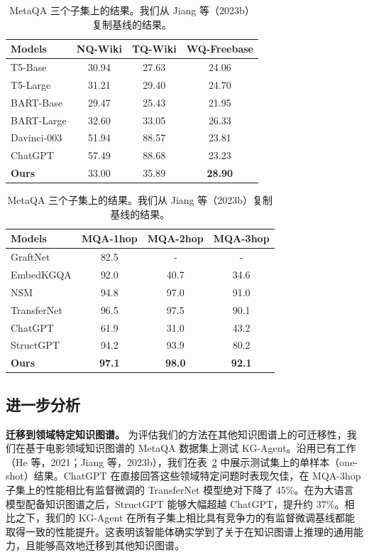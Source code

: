 \documentclass[11pt,UTF8,fontset=fandol]{ctexart}
\begin{document}
\begin{table}[H]
\begin{minipage}[t]{0.49\linewidth}\centering
\caption{域外 ODQA 数据集开发集子集上的结果。}
\label{tab:4}
\setlength{\tabcolsep}{4pt}
\begin{tabular}{lccc}
\toprule
Models & NQ-Wiki & TQ-Wiki & WQ-Freebase \\
\midrule
T5-Base      & 30.94 & 27.63 & 24.06 \\
T5-Large     & 31.21 & 29.40 & 24.70 \\
BART-Base    & 29.47 & 25.43 & 21.95 \\
BART-Large   & 32.60 & 33.05 & 26.33 \\
Davinci-003  & 51.94 & 88.57 & 23.81 \\
ChatGPT      & 57.49 & 88.68 & 23.23 \\
\textbf{Ours} & 33.00 & 35.89 & \textbf{28.90} \\
\bottomrule
\end{tabular}
\end{minipage}
\hfill
\begin{minipage}[t]{0.49\linewidth}\centering
\caption{MetaQA 三个子集上的结果。我们从 Jiang 等（2023b）复制基线的结果。}
\label{tab:5}
\setlength{\tabcolsep}{4pt}
\begin{tabular}{lccc}
\toprule
Models & MQA-1hop & MQA-2hop & MQA-3hop \\
\midrule
GraftNet     & 82.5 & -    & -    \\
EmbedKGQA    & 92.0 & 40.7 & 34.6 \\
NSM          & 94.8 & 97.0 & 91.0 \\
TransferNet  & 96.5 & 97.5 & 90.1 \\
ChatGPT      & 61.9 & 31.0 & 43.2 \\
StructGPT    & 94.2 & 93.9 & 80.2 \\
\textbf{Ours} & \textbf{97.1} & \textbf{98.0} & \textbf{92.1} \\
\bottomrule
\end{tabular}
\end{minipage}
\end{table}

\subsection{进一步分析}

\textbf{迁移到领域特定知识图谱。}
为评估我们的方法在其他知识图谱上的可迁移性，我们在基于电影领域知识图谱的 MetaQA 数据集上测试 KG-Agent。沿用已有工作（He 等，2021；Jiang 等，2023b），我们在表~\ref{tab:5} 中展示测试集上的单样本（one-shot）结果。ChatGPT 在直接回答这些领域特定问题时表现欠佳，在 MQA-3hop 子集上的性能相比有监督微调的 TransferNet 模型绝对下降了 45\%。在为大语言模型配备知识图谱之后，StructGPT 能够大幅超越 ChatGPT，提升约 37\%。相比之下，我们的 KG-Agent 在所有子集上相比具有竞争力的有监督微调基线都能取得一致的性能提升。这表明该智能体确实学到了关于在知识图谱上推理的通用能力，且能够高效地迁移到其他知识图谱。
\end{document}
